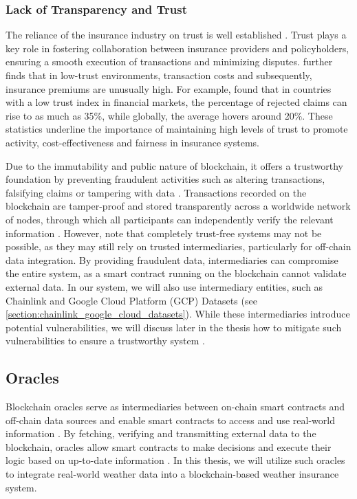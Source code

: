 \subsubsection{Lack of Transparency and Trust}
The reliance of the insurance industry on trust is well established \autocite{courbage2021trust}. Trust plays a key role in fostering collaboration between insurance providers and policyholders, ensuring a smooth execution of transactions and minimizing disputes. \textcite{guiso2012trust} further finds that in low-trust environments, transaction costs and subsequently, insurance premiums are unusually high. For example, \textcite{gennaioli2022trust} found that in countries with a low trust index in financial markets, the percentage of rejected claims can rise to as much as 35\%, while globally, the average hovers around 20\%. These statistics underline the importance of maintaining high levels of trust to promote activity, cost-effectiveness and fairness in insurance systems.

Due to the immutability and public nature of blockchain, it offers a trustworthy foundation by preventing fraudulent activities such as altering transactions, falsifying claims or tampering with data \autocite{Ahmad2024Fraud}. Transactions recorded on the blockchain are tamper-proof and stored transparently across a worldwide network of nodes, through which all participants can independently verify the relevant information \autocite{eigelshoven2021cryptocurrency}. However, \textcite{hawlitschek2018limits} note that completely trust-free systems may not be possible, as they may still rely on trusted intermediaries, particularly for off-chain data integration. By providing fraudulent data, intermediaries can compromise the entire system, as a smart contract running on the blockchain cannot validate external data. In our system, we will also use intermediary entities, such as Chainlink and Google Cloud Platform (GCP) Datasets (see \cref{section:chainlink_google_cloud_datasets}). While these intermediaries introduce potential vulnerabilities, we will discuss later in the thesis how to mitigate such vulnerabilities to ensure a trustworthy system \autocite{Khan2022Investigation}.

\subsection{Oracles}
Blockchain oracles serve as intermediaries between on-chain smart contracts and off-chain data sources and enable smart contracts to access and use real-world information \autocite{caldarelli2022overview}. By fetching, verifying and transmitting external data to the blockchain, oracles allow smart contracts to make decisions and execute their logic based on up-to-date information \autocite{pasdar2023connect}. In this thesis, we will utilize such oracles to integrate real-world weather data into a blockchain-based weather insurance system.

